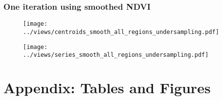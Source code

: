 \documentclass[10pt,a4paper,onecolumn]{article}
\begin{document}
\subsubsection{One iteration using smoothed NDVI}






  \begin{figure}[H] \centering
            \captionsetup{justification=centering}
              \texttt{[image: ../views/centroids\_smooth\_all\_regions\_undersampling.pdf]}
              
 \end{figure}


  \begin{figure}[H] \centering
            \captionsetup{justification=centering}
              \texttt{[image: ../views/series\_smooth\_all\_regions\_undersampling.pdf]}
              
 \end{figure}

 





\section{Appendix: Tables and Figures}\label{sec:appendix_tables} 
\end{document}
